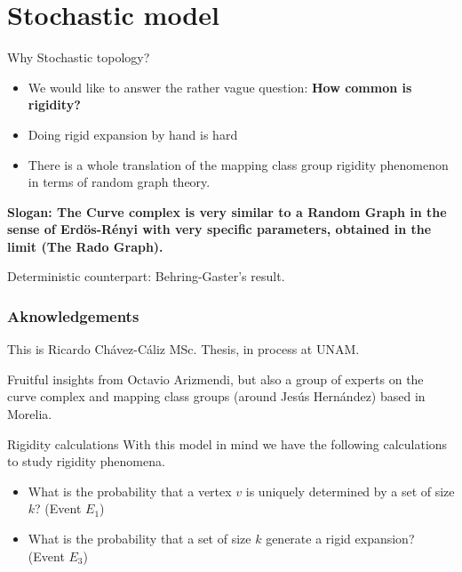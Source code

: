 \documentclass[handout]{beamer}
\theoremstyle{plain}
\begin{document}
\section{Stochastic model}
\begin{frame}{Why Stochastic topology?}
\begin{itemize}
    \item We would like to answer the rather vague question: \textbf{How common is rigidity?}
    \item Doing rigid expansion by hand is hard
    \item There is a  whole translation of the mapping class group rigidity phenomenon in terms of random graph theory.
\end{itemize}    
\end{frame}


\begin{frame}

\textbf{Slogan: The  Curve  complex  is   very  similar  to  a Random Graph  in the  sense  of  Erd\"os-R\'enyi  with  very  specific  parameters,  obtained  in the  limit (The  Rado Graph). \pause }

Deterministic counterpart: Behring-Gaster's result. 

\end{frame}

\begin{frame}\frametitle{Aknowledgements}

\begin{center}
This  is  Ricardo Ch\'avez-C\'aliz  MSc. Thesis, in process at  UNAM. 
\end{center}

Fruitful  insights  from  Octavio Arizmendi, \pause but  also a  group  of  experts on the  curve  complex  and  mapping class  groups (around Jes\'us Hern\'andez) based  in Morelia.

\end{frame}


\begin{frame}{Rigidity calculations}
With this model in mind we have the following calculations to study rigidity phenomena.

\begin{itemize}
\item What is the probability that a vertex $v$ is uniquely determined by a set of size $k$? (Event $E_1$)
 \item What is the probability that a set of size $k$ generate a rigid expansion? (Event $E_3$)
\end{itemize}

\end{frame}
\end{document}
